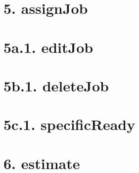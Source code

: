\pagebreak

\section*{5. assignJob}

\pagebreak

\section*{5a.1. editJob}

\pagebreak

\section*{5b.1. deleteJob}

\pagebreak

\section*{5c.1. specificReady}

\pagebreak

\section*{6. estimate}

\pagebreak
